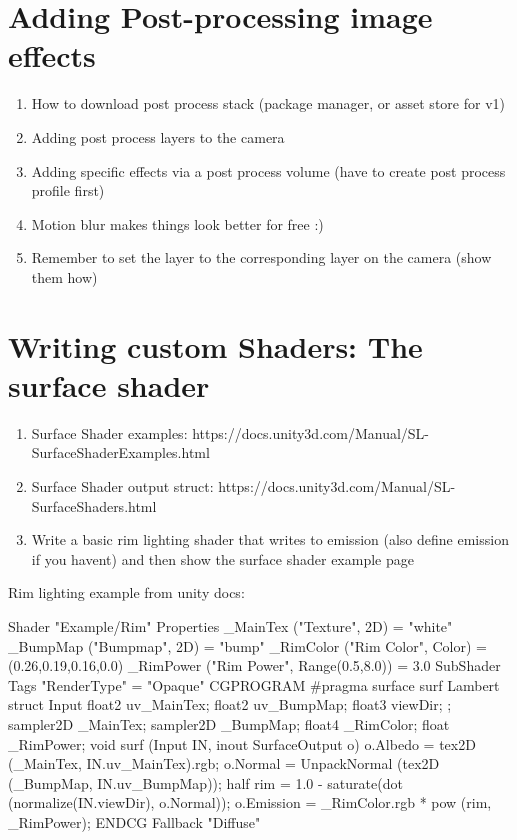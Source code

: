 \documentclass[11pt]{article}
\begin{document}
\section{Adding Post-processing image effects}

\begin{enumerate}
	\item How to download post process stack (package manager, or asset store for v1)
	\item Adding post process layers to the camera
	\item Adding specific effects via a post process volume (have to create post process profile first)
	\item Motion blur makes things look better for free :)
	\item Remember to set the layer to the corresponding layer on the camera (show them how)
\end{enumerate}


\section{Writing custom Shaders: The surface shader}

\begin{enumerate}
	\item Surface Shader examples: https://docs.unity3d.com/Manual/SL-SurfaceShaderExamples.html
	\item Surface Shader output struct: https://docs.unity3d.com/Manual/SL-SurfaceShaders.html
	\item Write a basic rim lighting shader that writes to emission (also define emission if you havent) and then show the surface shader example page
\end{enumerate}

Rim lighting example from unity docs:
\begin{csharp}
Shader "Example/Rim" {
	Properties {
	  _MainTex ("Texture", 2D) = "white" {}
	  _BumpMap ("Bumpmap", 2D) = "bump" {}
	  _RimColor ("Rim Color", Color) = (0.26,0.19,0.16,0.0)
	  _RimPower ("Rim Power", Range(0.5,8.0)) = 3.0
	}
	SubShader {
	  Tags { "RenderType" = "Opaque" }
	  CGPROGRAM
	  #pragma surface surf Lambert
	  struct Input {
	      float2 uv_MainTex;
	      float2 uv_BumpMap;
	      float3 viewDir;
	  };
	  sampler2D _MainTex;
	  sampler2D _BumpMap;
	  float4 _RimColor;
	  float _RimPower;
	  void surf (Input IN, inout SurfaceOutput o) {
	      o.Albedo = tex2D (_MainTex, IN.uv_MainTex).rgb;
	      o.Normal = UnpackNormal (tex2D (_BumpMap, IN.uv_BumpMap));
	      half rim = 1.0 - saturate(dot (normalize(IN.viewDir), o.Normal));
	      o.Emission = _RimColor.rgb * pow (rim, _RimPower);
	  }
	  ENDCG
	} 
	Fallback "Diffuse"
}
\end{csharp}
\end{document}
